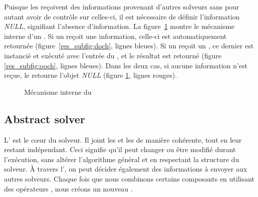 Puisque les \infr{\opchs{}} reçoivent des informations provenant  d'autres solveurs sans pour autant avoir de contrôle sur celles-ci, il est  nécessaire  de définir l'information {\it  NULL}, signifiant l'absence  d'information. La figure~\ref{res_fig:ochperform}  montre  le mécanisme interne d'un \infr{\opch{}}. Si un \infr{\dopch{}} reçoit une information, celle-ci est automatiquement retournée (figure~\ref{res_subfig:doch}, lignes bleues). Si un \infr{\oopch{}} reçoit un \infr{\om{}}, ce dernier est instancié et exécuté avec l'entrée du \infr{\opch}, et le résultat est retourné (figure \ref{res_subfig:ooch}, lignes bleues). Dans les deux cas, si aucune information n'est reçue, le \infr{\opch{}} retourne l'objet  {\it NULL}  (figure \ref{res_fig:ochperform}, lignes rouges).

\begin{figure}
	\centering
	\hspace{0.05\textwidth}%
	\caption[]{Mécanisme interne du \opch}
	\label{res_fig:ochperform}
\end{figure}%

\subsection{Abstract solver}

L'\infr{\as{}} est le c\oe{}ur du solveur. Il joint les \infr{\oms{}} et les \infr{\opchs{}} de  manière cohérente, tout en leur restant indépendant. Ceci signifie  qu'il peut changer ou être modifié durant l'exécution, sans altérer  l'algorithme général et en respectant la structure du solveur. À travers l'\infr{\as}, on peut décider également des informations à envoyer aux autres solveurs. Chaque fois que nous combinons certains composants en utilisant des opérateurs \posl{}, nous créons un nouveau \infr{\m}.

